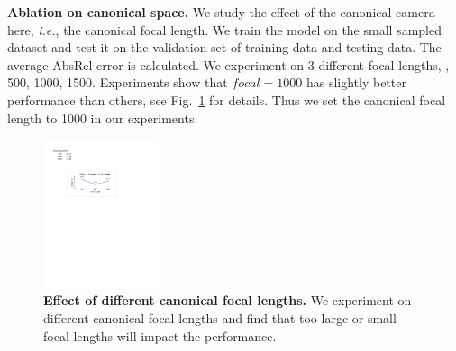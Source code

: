 \begin{table}[]
\caption{Effectiveness of our CSTM. CamConvs~\cite{facil2019cam} directly encodes various camera models in the network, while we perform a simple yet effective transformation to solve the metric ambiguity. Without CSTM, the model cannot achieve transferable metric prediction ability.}
\vspace{-1 em}
\label{table: importance of camera model.}
\vspace{-1 em}
\end{table}





\noindent\textbf{Ablation on canonical space.}
We study the effect of the canonical camera here, \textit{i.e.}, the canonical focal length. We train the model on the small sampled dataset and test it on the validation set of training data and testing data. The average AbsRel error is calculated.  We experiment on 3 different focal lengths, \ie, 500, 1000, 1500. Experiments show that $focal=1000$ has slightly better performance than others, see Fig.~\ref{fig: canonical focal length.} for details. Thus we set the canonical focal length to 1000 in our experiments.

\begin{figure}[]
\centering
\includegraphics[width=0.3\textwidth]{./files/precision.pdf}
\caption{\textbf{Effect of different canonical focal lengths.} We experiment on different canonical focal lengths and find that too large or small focal lengths will impact the performance. }
\label{fig: canonical focal length.}
\end{figure}

